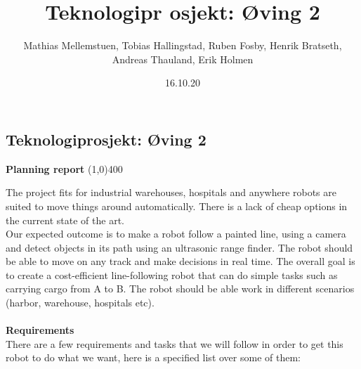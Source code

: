 \documentclass[11pt]{article}
\title{Teknologipr  osjekt: Øving 2}
\author{Mathias Mellemstuen, Tobias Hallingstad, Ruben Fosby, Henrik Bratseth, Andreas Thauland, Erik Holmen}
\date{16.10.20}
\begin{document}
\begin{center}
\section*{Teknologiprosjekt: Øving 2}
\textbf{Planning report}
\line(1,0){400}
\end{center}
The project fits for industrial warehouses, hospitals and anywhere robots are suited to move things around automatically. There is a lack of cheap options in the current state of the art.
\\Our expected outcome is to make a robot follow a painted line, using a camera and detect objects in its path using an ultrasonic range finder. The robot should be able to move on any track and make decisions in real time.
The overall goal is to create a cost-efficient line-following robot that can do simple tasks such as carrying cargo from A to B. The robot should be able work in different scenarios (harbor, warehouse, hospitals etc).
\\\\
\textbf{Requirements}\\
There are a few requirements and tasks that we will follow in order to get this robot to do what we want, here is a specified list over some of them:
\end{document}
